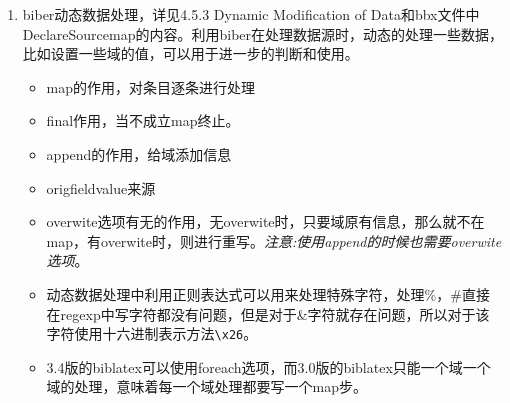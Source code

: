 \begin{enumerate}
  \item biber动态数据处理，详见4.5.3 Dynamic Modification of Data和bbx文件中DeclareSourcemap的内容。利用biber在处理数据源时，动态的处理一些数据，比如设置一些域的值，可以用于进一步的判断和使用。
  \begin{itemize}
    \item map的作用，对条目逐条进行处理
    \item final作用，当不成立map终止。
    \item append的作用，给域添加信息
    \item origfieldvalue来源
    \item overwite选项有无的作用，无overwite时，只要域原有信息，那么就不在map，有overwite时，则进行重写。\emph{注意:使用append的时候也需要overwite选项}。
    \item 动态数据处理中利用正则表达式可以用来处理特殊字符，处理\%，\#直接在regexp中写字符都没有问题，但是对于\&字符就存在问题，所以对于该字符使用十六进制表示方法\verb|\x26|。
    \item 3.4版的biblatex可以使用foreach选项，而3.0版的biblatex只能一个域一个域的处理，意味着每一个域处理都要写一个map步。
  \end{itemize}


\end{enumerate}
